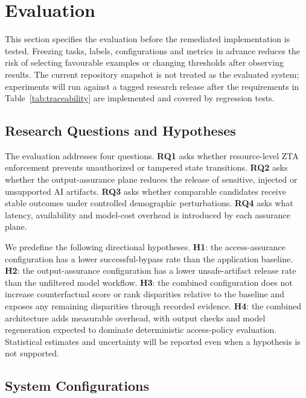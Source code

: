 \documentclass[conference]{IEEEtran}
\begin{document}
\section{Evaluation}

This section specifies the evaluation before the remediated implementation is tested. Freezing tasks, labels, configurations and metrics in advance reduces the risk of selecting favourable examples or changing thresholds after observing results. The current repository snapshot is not treated as the evaluated system; experiments will run against a tagged research release after the requirements in Table~\ref{tab:traceability} are implemented and covered by regression tests.

\subsection{Research Questions and Hypotheses}

The evaluation addresses four questions. \textbf{RQ1} asks whether resource-level ZTA enforcement prevents unauthorized or tampered state transitions. \textbf{RQ2} asks whether the output-assurance plane reduces the release of sensitive, injected or unsupported AI artifacts. \textbf{RQ3} asks whether comparable candidates receive stable outcomes under controlled demographic perturbations. \textbf{RQ4} asks what latency, availability and model-cost overhead is introduced by each assurance plane.

We predefine the following directional hypotheses. \textbf{H1}: the access-assurance configuration has a lower successful-bypass rate than the application baseline. \textbf{H2}: the output-assurance configuration has a lower unsafe-artifact release rate than the unfiltered model workflow. \textbf{H3}: the combined configuration does not increase counterfactual score or rank disparities relative to the baseline and exposes any remaining disparities through recorded evidence. \textbf{H4}: the combined architecture adds measurable overhead, with output checks and model regeneration expected to dominate deterministic access-policy evaluation. Statistical estimates and uncertainty will be reported even when a hypothesis is not supported.

\subsection{System Configurations}
\end{document}
